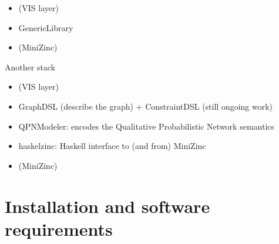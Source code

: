 \documentclass[]{article}
\begin{document}


\begin{itemize}
\item
  (VIS layer)
\item
  GenericLibrary
\item
  (MiniZinc)
\end{itemize}
Another stack
\begin{itemize}
\item
  (VIS layer)
\item
  GraphDSL (describe the graph) + ConstraintDSL (still ongoing work)
\item
  QPNModeler: encodes the Qualitative Probabilistic Network semantics
\item
  haskelzinc: Haskell interface to (and from) MiniZinc
\item
  (MiniZinc)
\end{itemize}

\section{Installation and software requirements}
\label{install-and-reqs}







\end{document}
